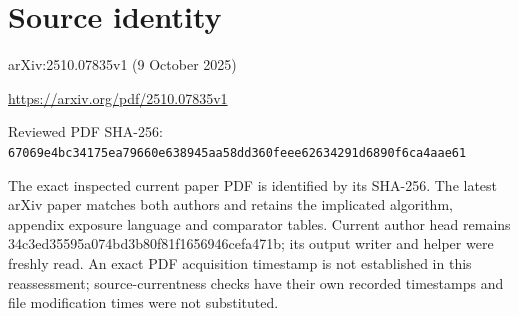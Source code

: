 \documentclass[11pt]{article}
\begin{document}
\section*{Source identity}

arXiv:2510.07835v1 (9 October 2025)

\url{https://arxiv.org/pdf/2510.07835v1}

Reviewed PDF SHA-256: \nolinkurl{67069e4bc34175ea79660e638945aa58dd360feee62634291d6890f6ca4aae61}

The exact inspected current paper PDF is identified by its SHA-256. The latest arXiv paper matches both authors and retains the implicated algorithm, appendix exposure language and comparator tables. Current author head remains 34c3ed35595a074bd3b80f81f1656946cefa471b; its output writer and helper were freshly read. An exact PDF acquisition timestamp is not established in this reassessment; source-currentness checks have their own recorded timestamps and file modification times were not substituted.
\end{document}
